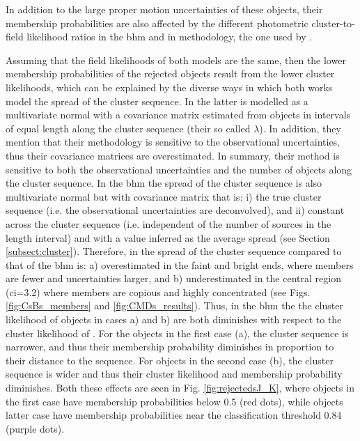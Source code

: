 In addition to the large proper motion uncertainties of these objects, their membership probabilities are also affected by the different photometric cluster-to-field likelihood ratios in the \gls{bhm} and in \citet{Sarro2014} methodology, the one used by \citet{Bouy2015}.

Assuming that the field likelihoods of both models are the same, then the lower membership probabilities of the rejected objects result from the lower cluster likelihoods, which can be explained by the diverse ways in which both works model the spread of the cluster sequence. In \citet{Sarro2014} the latter is modelled as a multivariate normal with a covariance matrix estimated from objects in intervals of equal length along the cluster sequence (their so called $\lambda$). In addition, they mention that their methodology is sensitive to the observational uncertainties, thus their covariance matrices are overestimated. In summary, their method is sensitive to both the observational uncertainties and the number of objects along the cluster sequence. In the \gls{bhm} the spread of the cluster sequence is also multivariate normal but with covariance matrix that is: i) the true cluster sequence (i.e. the observational uncertainties are deconvolved), and ii) constant across the cluster sequence (i.e. independent of the number of sources in the length interval) and with a value inferred as the average spread (see Section \ref{subsect:cluster}).  Therefore, in \citet{Bouy2015} the spread of the cluster sequence compared to that of the \gls{bhm} is: a) overestimated in the faint and bright ends, where members are fewer and uncertainties larger, and b) underestimated in the central region (\gls{ci}=3.2) where members are copious and highly concentrated (see Figs. \ref{fig:CsBs_members} and \ref{fig:CMDs_results}). Thus, in the \gls{bhm} the the cluster likelihood of objects in cases a) and b) are both diminishes with respect to the cluster likelihood of \citet{Bouy2015}. For the objects in the first case (a), the cluster sequence is narrower, and thus their membership probability diminishes in proportion to their distance to the sequence. For objects in the second case (b),  the cluster sequence is wider and thus their cluster likelihood and membership probability diminishes. Both these effects are seen in Fig. \ref{fig:rejectedsJ_K}, where objects in the first case have membership probabilities below 0.5 (red dots), while objects latter case have membership probabilities near the classification threshold 0.84 (purple dots).

